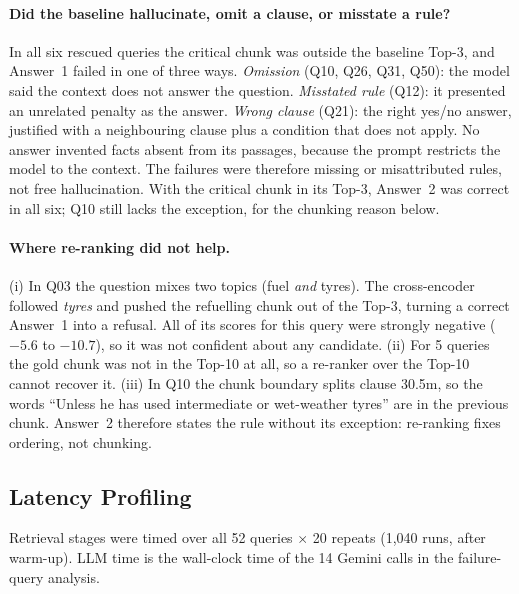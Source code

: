\documentclass[11pt,a4paper]{article}
\begin{document}
\paragraph{Did the baseline hallucinate, omit a clause, or misstate a rule?} In all six rescued queries the
critical chunk was outside the baseline Top-3, and Answer~1 failed in one of three ways. \emph{Omission} (Q10, Q26,
Q31, Q50): the model said the context does not answer the question. \emph{Misstated rule} (Q12): it presented an
unrelated penalty as the answer. \emph{Wrong clause} (Q21): the right yes/no answer, justified with a neighbouring
clause plus a condition that does not apply. No answer invented facts absent from its passages, because the prompt
restricts the model to the context. The failures were therefore missing or misattributed rules, not free
hallucination. With the critical chunk in its Top-3, Answer~2 was correct in all six; Q10 still lacks the
exception, for the chunking reason below.

\paragraph{Where re-ranking did not help.} (i) In Q03 the question mixes two topics (fuel \emph{and} tyres). The
cross-encoder followed \emph{tyres} and pushed the refuelling chunk out of the Top-3, turning a correct Answer~1
into a refusal. All of its scores for this query were strongly negative ($-5.6$ to $-10.7$), so it was not
confident about any candidate. (ii) For 5 queries the gold chunk was not in the Top-10 at all, so a re-ranker over
the Top-10 cannot recover it. (iii) In Q10 the chunk boundary splits clause 30.5m, so the words ``Unless he has
used intermediate or wet-weather tyres'' are in the previous chunk. Answer~2 therefore states the rule without its
exception: re-ranking fixes ordering, not chunking.

\subsection{Latency Profiling}

Retrieval stages were timed over all 52 queries $\times$ 20 repeats (1{,}040 runs, after warm-up). LLM time is the
wall-clock time of the 14 Gemini calls in the failure-query analysis.
\end{document}
